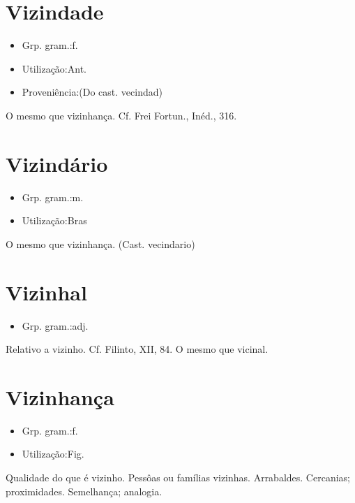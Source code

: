\documentclass{article}
\begin{document}
\section{Vizindade}
\begin{itemize}
\item {Grp. gram.:f.}
\end{itemize}
\begin{itemize}
\item {Utilização:Ant.}
\end{itemize}
\begin{itemize}
\item {Proveniência:(Do cast. \textunderscore vecindad\textunderscore )}
\end{itemize}
O mesmo que \textunderscore vizinhança\textunderscore . Cf. Frei Fortun., \textunderscore Inéd.\textunderscore , 316.
\section{Vizindário}
\begin{itemize}
\item {Grp. gram.:m.}
\end{itemize}
\begin{itemize}
\item {Utilização:Bras}
\end{itemize}
O mesmo que \textunderscore vizinhança\textunderscore .
(Cast. \textunderscore vecindario\textunderscore )
\section{Vizinhal}
\begin{itemize}
\item {Grp. gram.:adj.}
\end{itemize}
Relativo a vizinho. Cf. Filinto, XII, 84.
O mesmo que \textunderscore vicinal\textunderscore .
\section{Vizinhança}
\begin{itemize}
\item {Grp. gram.:f.}
\end{itemize}
\begin{itemize}
\item {Utilização:Fig.}
\end{itemize}
Qualidade do que é vizinho.
Pessôas ou famílias vizinhas.
Arrabaldes.
Cercanias; proximidades.
Semelhança; analogia.
\end{document}
